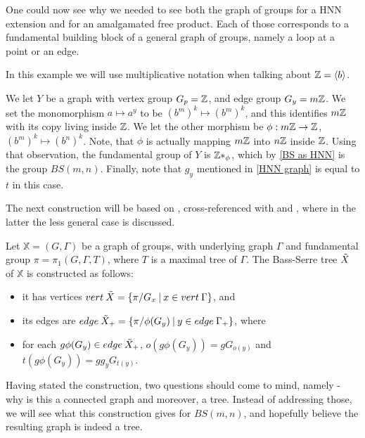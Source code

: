 \begin{remark}
    One could now see why we needed to see both the graph of groups for a HNN extension and for an amalgamated free product. Each of those corresponds to a fundamental building block of a general graph of groups, namely a loop at a point or an edge.
\end{remark}

\begin{importantexample} \label{BS graph} In this example we will use multiplicative notation when talking about $\mathbb{Z} = \langle b \rangle$. 

We let $Y$ be a graph with vertex group $G_p = \mathbb{Z}$, and edge group $G_y = m\mathbb{Z}$. We set the monomorphism $a \mapsto a^y$ to be $(b^m)^k \mapsto (b^m)^k$, and this identifies $m\mathbb{Z}$ with its copy living inside $\mathbb{Z}$. We let the other morphism be $\phi: m\mathbb{Z} \to \mathbb{Z}$, $(b^m)^k \mapsto (b^n)^k$. Note, that $\phi$ is actually mapping $m\mathbb{Z}$ into $n\mathbb{Z}$ inside $\mathbb{Z}$. Using that observation, the fundamental group of $Y$ is $\mathbb{Z} \ast _\phi$, which by \ref{BS as HNN} is the group $BS(m,n)$. Finally, note that $g_y$ mentioned in \ref{HNN graph} is equal to $t$ in this case.
\end{importantexample}

The next construction will be based on \cite[pages 23-24]{GoPaXi24}, cross-referenced with \cite{Wil} and \cite{BajoHNN}, where in the latter the less general case is discussed.

\begin{construction} \label{universalcover}
    Let $\mathbb{X} = (G,\Gamma)$ be a graph of groups, with underlying graph $\Gamma$ and fundamental group $\pi = \pi_1(G,\Gamma,T)$, where $T$ is a maximal tree of $\Gamma$.
    The Bass-Serre tree $\Tilde{X}$ of $\mathbb{X}$ is constructed as follows:
    \begin{itemize}
        \item it has vertices $vert \: \Tilde{X} = \{\pi/G_x\:|\: x \in vert\:\Gamma\}$, and
        \item its edges are $edge \: \Tilde{X}_+ = \{\pi/\phi(G_y) \: | \: y \in edge \:\Gamma_+ \}$, where
        \item for each $g\phi(G_y) \in edge \: \Tilde{X}_+$, $o(g\phi(G_y)) = gG_{o(y)}$ and $t(g\phi(G_y)) = gg_yG_{t(y)}$.
    \end{itemize}
\end{construction}

Having stated the construction, two questions should come to mind, namely - why is this a connected graph and moreover, a tree. Instead of addressing those, we will see what this construction gives for $BS(m,n)$, and hopefully believe the resulting graph is indeed a tree.


